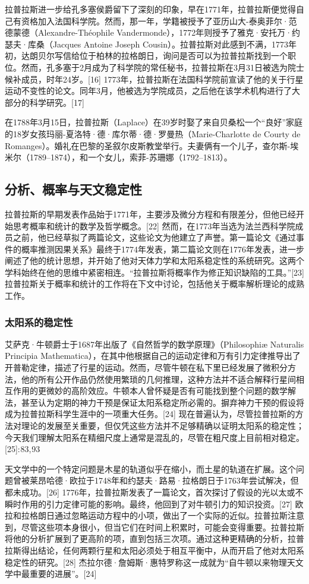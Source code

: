 拉普拉斯进一步给孔多塞侯爵留下了深刻的印象，早在1771年，拉普拉斯便觉得自己有资格加入法国科学院。然而，那一年，学籍被授予了亚历山大-泰奥菲尔·范德蒙德（Alexandre-Théophile Vandermonde），1772年则授予了雅克·安托万·约瑟夫·库桑（Jacques Antoine Joseph Cousin）。拉普拉斯对此感到不满，1773年初，达朗贝尔写信给位于柏林的拉格朗日，询问是否可以为拉普拉斯找到一个职位。然而，孔多塞于2月成为了科学院的常任秘书，拉普拉斯在3月31日被选为院士候补成员，时年24岁。[16] 1773年，拉普拉斯在法国科学院前宣读了他的关于行星运动不变性的论文。同年3月，他被选为学院成员，之后他在该学术机构进行了大部分的科学研究。[17]

在1788年3月15日，拉普拉斯（Laplace）在39岁时娶了来自贝桑松一个“良好”家庭的18岁女孩玛丽-夏洛特·德·库尔蒂·德·罗曼热（Marie-Charlotte de Courty de Romanges）。婚礼在巴黎的圣叙尔皮斯教堂举行。夫妻俩有一个儿子，查尔斯-埃米尔（1789–1874），和一个女儿，索菲-苏珊娜（1792–1813）。
\subsection{分析、概率与天文稳定性}
拉普拉斯的早期发表作品始于1771年，主要涉及微分方程和有限差分，但他已经开始思考概率和统计的数学及哲学概念。[22] 然而，在1773年当选为法兰西科学院成员之前，他已经草拟了两篇论文，这些论文为他建立了声誉。第一篇论文《通过事件的概率推测因果关系》最终于1774年发表，第二篇论文则在1776年发表，进一步阐述了他的统计思想，并开始了他对天体力学和太阳系稳定性的系统研究。这两个学科始终在他的思维中紧密相连。“拉普拉斯将概率作为修正知识缺陷的工具。”[23] 拉普拉斯关于概率和统计的工作将在下文中讨论，包括他关于概率解析理论的成熟工作。
\subsubsection{太阳系的稳定性}  
艾萨克·牛顿爵士于1687年出版了《自然哲学的数学原理》（Philosophiæ Naturalis Principia Mathematica），在其中他根据自己的运动定律和万有引力定律推导出了开普勒定律，描述了行星的运动。然而，尽管牛顿在私下里已经发展了微积分方法，他的所有公开作品仍然使用繁琐的几何推理，这种方法并不适合解释行星间相互作用的更微妙的高阶效应。牛顿本人曾怀疑是否有可能找到整个问题的数学解法，甚至认为定期的神力干预是保证太阳系稳定所必需的。摒弃神力干预的假设将成为拉普拉斯科学生涯中的一项重大任务。[24] 现在普遍认为，尽管拉普拉斯的方法对理论的发展至关重要，但仅凭这些方法并不足够精确以证明太阳系的稳定性；今天我们理解太阳系在精细尺度上通常是混乱的，尽管在粗尺度上目前相对稳定。[25]: 83, 93

天文学中的一个特定问题是木星的轨道似乎在缩小，而土星的轨道在扩展。这个问题曾被莱昂哈德·欧拉于1748年和约瑟夫·路易·拉格朗日于1763年尝试解决，但都未成功。[26] 1776年，拉普拉斯发表了一篇论文，首次探讨了假设的光以太或不瞬时作用的引力定律可能的影响。最终，他回到了对牛顿引力的知识投资。[27] 欧拉和拉格朗日通过忽略运动方程中的小项，做出了一个实际的近似。拉普拉斯注意到，尽管这些项本身很小，但当它们在时间上积累时，可能会变得重要。拉普拉斯将他的分析扩展到了更高阶的项，直到包括三次项。通过这种更精确的分析，拉普拉斯得出结论，任何两颗行星和太阳必须处于相互平衡中，从而开启了他对太阳系稳定性的研究。[28] 杰拉尔德·詹姆斯·惠特罗称这一成就为“自牛顿以来物理天文学中最重要的进展”。[24]

